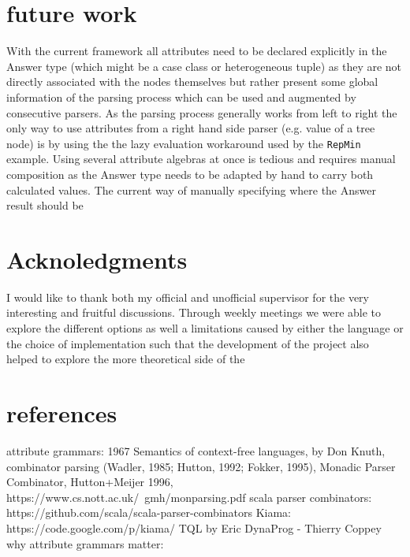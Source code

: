 \section{future work}
With the current framework all attributes need to be declared explicitly in the Answer type (which might be a case class or heterogeneous tuple) as they are not directly associated with the nodes themselves but rather present some global information of the parsing process which can be used and augmented by consecutive parsers.
As the parsing process generally works from left to right the only way to use attributes from a right hand side parser (e.g. value of a tree node) is by using the the lazy evaluation workaround used by the \verb/RepMin/ example. 
Using several attribute algebras at once is tedious and requires manual composition as the Answer type needs to be adapted by hand to carry both calculated values.
The current way of manually specifying where the Answer result should be 

\section{Acknoledgments}
I would like to thank both my official and unofficial supervisor for the very interesting and fruitful discussions. Through weekly meetings we were able to explore the different options as well a limitations caused by either the language or the choice of implementation such that the development of the project also helped to explore the more theoretical side of the 

\section{references}
attribute grammars: 1967 Semantics of context-free languages, by Don Knuth, 
combinator parsing (Wadler, 1985; Hutton, 1992; Fokker, 1995),
Monadic Parser Combinator, Hutton+Meijer 1996, https://www.cs.nott.ac.uk/~gmh/monparsing.pdf 
scala parser combinators: https://github.com/scala/scala-parser-combinators
Kiama: https://code.google.com/p/kiama/
TQL by Eric
DynaProg - Thierry Coppey
why attribute grammars matter: %
